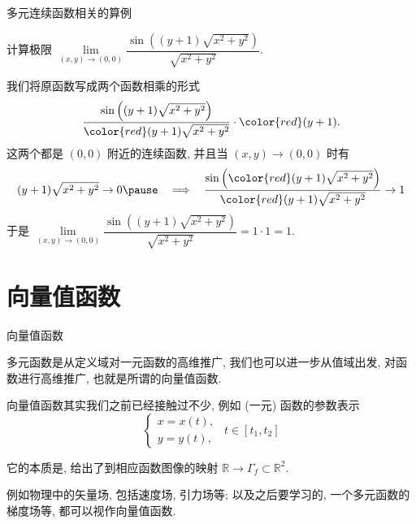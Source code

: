 
\begin{frame}{多元连续函数相关的算例}

\begin{eg}
计算极限 $\lim\limits_{(x,y) \to (0,0)} \dfrac{\sin \left( (y+1) \sqrt{x^2 + y^2} \right)}{\sqrt{x^2 + y^2}}.$
\end{eg}

\pause
\vspace{1em}

我们将原函数写成两个函数相乘的形式
\[\dfrac{\sin \left( (y+1) \sqrt{x^2 + y^2} \right)}{{\color{red}(y+1)} \sqrt{x^2 + y^2}} \cdot {\color{red}(y+1)}.\]
这两个都是 $(0,0)$ 附近的连续函数, 并且当 $(x,y) \to (0,0)$ 时有
\[
(y+1) \sqrt{x^2 + y^2} \to 0
\pause
~~ \implies ~~ \dfrac{\sin \left( {\color{red} (y+1) \sqrt{x^2 + y^2}} \right)}{\color{red} (y+1) \sqrt{x^2 + y^2}} \to 1
\]
\pause
于是 $\lim\limits_{(x,y) \to (0,0)} \dfrac{\sin \left( (y+1) \sqrt{x^2 + y^2} \right)}{\sqrt{x^2 + y^2}} = 1 \cdot 1 = 1.$

\end{frame}


\section{向量值函数}


\begin{frame}{向量值函数}

多元函数是从定义域对一元函数的高维推广, 我们也可以进一步从值域出发, 对函数进行高维推广, 也就是所谓的向量值函数.

\pause
\vspace{1em}

向量值函数其实我们之前已经接触过不少, 例如 (一元) 函数的参数表示
\[
\begin{cases}
x = x(t), \\
y = y(t),
\end{cases} ~~ t \in [t_1, t_2]
\]

\pause

它的本质是, 给出了到相应函数图像的映射 $\mathbb{R} \longrightarrow \Gamma_f \subset \mathbb{R}^2.$

\pause
\vspace{1em}

例如物理中的矢量场, 包括速度场, 引力场等; 以及之后要学习的, 一个多元函数的梯度场等, 都可以视作向量值函数.

\end{frame}

